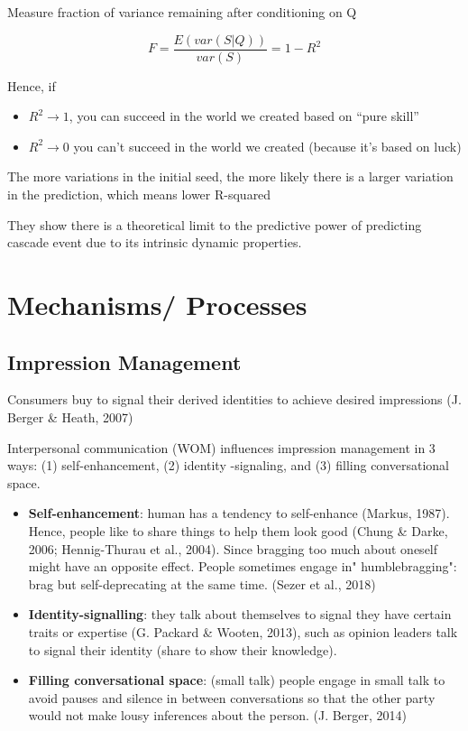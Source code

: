\documentclass[
]{book}
\providecommand{\tightlist}{%
  \setlength{\itemsep}{0pt}\setlength{\parskip}{0pt}}
\begin{document}
Measure fraction of variance remaining after conditioning on Q

\[
F = \frac{E(var(S|Q))}{var(S)} = 1 - R^2
\]

Hence, if

\begin{itemize}
\item
  \(R^2 \to 1\), you can succeed in the world we created based on ``pure skill''
\item
  \(R^2 \to 0\) you can't succeed in the world we created (because it's based on luck)
\end{itemize}

The more variations in the initial seed, the more likely there is a larger variation in the prediction, which means lower R-squared

They show there is a theoretical limit to the predictive power of predicting cascade event due to its intrinsic dynamic properties.

\hypertarget{mechanisms-processes}{%
\section{Mechanisms/ Processes}\label{mechanisms-processes}}

\hypertarget{impression-management}{%
\subsection{Impression Management}\label{impression-management}}

Consumers buy to signal their derived identities to achieve desired impressions (J. Berger \& Heath, 2007)

Interpersonal communication (WOM) influences impression management in 3 ways: (1) self-enhancement, (2) identity -signaling, and (3) filling conversational space.

\begin{itemize}
\tightlist
\item
  \textbf{Self-enhancement}: human has a tendency to self-enhance (Markus, 1987). Hence, people like to share things to help them look good (Chung \& Darke, 2006; Hennig-Thurau et al., 2004). Since bragging too much about oneself might have an opposite effect. People sometimes engage in" humblebragging": brag but self-deprecating at the same time. (Sezer et al., 2018)
\item
  \textbf{Identity-signalling}: they talk about themselves to signal they have certain traits or expertise (G. Packard \& Wooten, 2013), such as opinion leaders talk to signal their identity (share to show their knowledge).
\item
  \textbf{Filling conversational space}: (small talk) people engage in small talk to avoid pauses and silence in between conversations so that the other party would not make lousy inferences about the person. (J. Berger, 2014)
\end{itemize}
\end{document}
